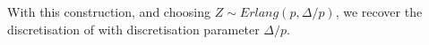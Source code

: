 With this construction, and choosing \(Z\sim Erlang(p,\Delta/p)\), we recover the discretisation of \cite{bo2013} with discretisation parameter \(\Delta/p\).



